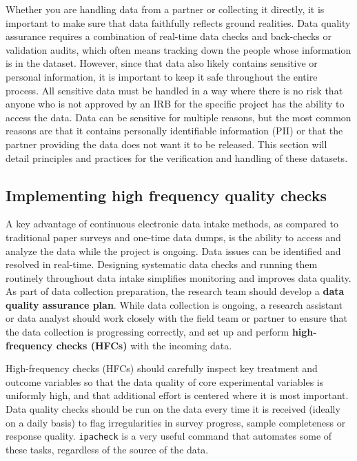 Whether you are handling data from a partner or collecting it directly,
it is important to make sure that data faithfully reflects ground realities.
Data quality assurance requires a combination of real-time data checks
and back-checks or validation audits, which often means tracking down
the people whose information is in the dataset.
However, since that data also likely contains sensitive or personal information,
it is important to keep it safe throughout the entire process.
All sensitive data must be handled in a way
where there is no risk that anyone who is not approved by an IRB
for the specific project has the ability to access the data.
Data can be sensitive for multiple reasons,
but the most common reasons are that it contains personally identifiable information (PII)
or that the partner providing the data does not want it to be released.
This section will detail principles and practices for the verification and handling of these datasets.

\subsection{Implementing high frequency quality checks}

A key advantage of continuous electronic data intake methods,
as compared to traditional paper surveys and one-time data dumps,
is the ability to access and analyze the data while the project is ongoing.
Data issues can be identified and resolved in real-time.
Designing systematic data checks and running them routinely throughout data intake
simplifies monitoring and improves data quality.
As part of data collection preparation,
the research team should develop a \textbf{data quality assurance plan}.
While data collection is ongoing,
a research assistant or data analyst should work closely with the field team or partner
to ensure that the data collection is progressing correctly,
and set up and perform \textbf{high-frequency checks (HFCs)} with the incoming data.

High-frequency checks (HFCs) should carefully inspect key treatment and outcome variables
so that the data quality of core experimental variables is uniformly high,
and that additional effort is centered where it is most important.
Data quality checks should be run on the data every time it is received (ideally on a daily basis)
to flag irregularities in survey progress, sample completeness or response quality.
\texttt{ipacheck}
is a very useful command that automates some of these tasks,
regardless of the source of the data.

